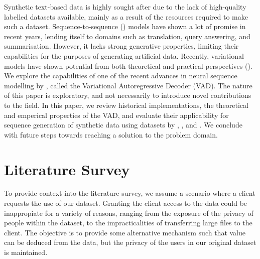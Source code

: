\documentclass[12pt,twoside]{report}
\begin{document}
Synthetic text-based data is highly sought after due to the lack of high-quality labelled datasets available, mainly as a result of the resources required to make such a dataset.
Sequence-to-sequence (\cite{sutskever_sequence_2014}) models have shown a lot of promise in recent years, lending itself to domains such as translation, query answering, and summarisation. However, it lacks strong generative properties, limiting their capabilities for the purposes of generating artificial data.
Recently, variational models have shown potential from both theoretical and practical perspectives (\cite{kingma_auto-encoding_2013}). We explore the capabilities of one of the recent advances in neural sequence modelling by \cite{du_variational_2018}, called the Variational Autoregressive Decoder (VAD). The nature of this paper is exploratory, and not necessarily to introduce novel contributions to the field. In this paper, we review historical implementations, the theoretical and emperical properties of the VAD, and evaluate their applicability for sequence generation of synthetic data using datasets by \cite{he_ups_2016}, \cite{lison_opensubtitles2016:_2016}, and \cite{lison_opensubtitles2016:_2016}. We conclude with future steps towards reaching a solution to the problem domain.




\chapter{Literature Survey}

To provide context into the literature survey, we assume a scenario where a client requests the use of our dataset. Granting the client access to the data could be inappropiate for a variety of reasons, ranging from the exposure of the privacy of people within the dataset, to the impracticalities of transferring large files to the client. The objective is to provide some alternative mechanism such that value can be deduced from the data, but the privacy of the users in our original dataset is maintained.
\end{document}
